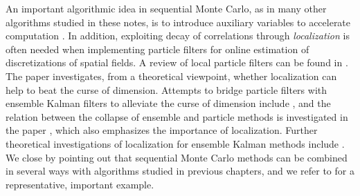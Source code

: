 An important algorithmic idea in sequential Monte Carlo, as in many other algorithms
studied in these notes, is to introduce auxiliary variables to accelerate computation
\cite{186, 118}. In addition, exploiting decay of correlations through \emph{localization}
is often needed when implementing particle filters for online estimation of
discretizations of spatial fields. A review of local particle filters can be found in
\cite{73}. The paper \cite{190} investigates, from a theoretical viewpoint, whether
localization can help to beat the curse of dimension. Attempts to bridge particle filters
with ensemble Kalman filters to alleviate the curse of dimension include \cite{76, 218},
and the relation between the collapse of ensemble and particle methods is investigated in
the paper \cite{165}, which also emphasizes the importance of localization. Further
theoretical investigations of localization for ensemble Kalman methods include \cite{6,
5}. We close by pointing out that sequential Monte Carlo methods can be combined in
several ways with algorithms studied in previous chapters, and we refer to \cite{10} for a
representative, important example.

